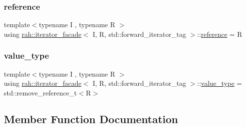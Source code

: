 \subsubsection{\texorpdfstring{reference}{reference}}
{\footnotesize\ttfamily template$<$typename I , typename R $>$ \\
using \mbox{\hyperlink{structrah_1_1iterator__facade}{rah\+::iterator\+\_\+facade}}$<$ I, R, std\+::forward\+\_\+iterator\+\_\+tag $>$\+::\mbox{\hyperlink{structrah_1_1iterator__facade_3_01_i_00_01_r_00_01std_1_1forward__iterator__tag_01_4_a19aa13e142ee687a3f9dd672d68a25c7}{reference}} =  R}

\mbox{\label{structrah_1_1iterator__facade_3_01_i_00_01_r_00_01std_1_1forward__iterator__tag_01_4_a95da65d8da6515cbd927873f565a9cdc}} 
\subsubsection{\texorpdfstring{value\_type}{value\_type}}
{\footnotesize\ttfamily template$<$typename I , typename R $>$ \\
using \mbox{\hyperlink{structrah_1_1iterator__facade}{rah\+::iterator\+\_\+facade}}$<$ I, R, std\+::forward\+\_\+iterator\+\_\+tag $>$\+::\mbox{\hyperlink{structrah_1_1iterator__facade_3_01_i_00_01_r_00_01std_1_1forward__iterator__tag_01_4_a95da65d8da6515cbd927873f565a9cdc}{value\+\_\+type}} =  std\+::remove\+\_\+reference\+\_\+t$<$R$>$}



\subsection{Member Function Documentation}
\mbox{\label{structrah_1_1iterator__facade_3_01_i_00_01_r_00_01std_1_1forward__iterator__tag_01_4_abd064784607e07a4fd444ce8ceb224ab}} 
